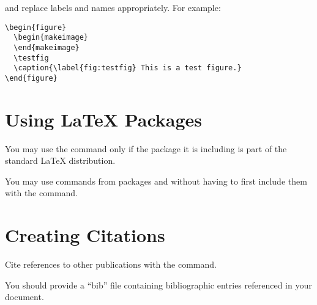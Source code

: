 \documentclass[11pt]{article}
\begin{document}
and replace labels and names appropriately.  For example:

\begin{verbatim}
\begin{figure}
  \begin{makeimage}
  \end{makeimage}
  \testfig
  \caption{\label{fig:testfig} This is a test figure.}
\end{figure}
\end{verbatim}


\section{Using \LaTeX{} Packages}

You may use the  command only if the package it is
including is part of the standard \LaTeX{} distribution.  

You may use commands from packages  and
 without having to first include them with the
 command.

\section{Creating Citations}

Cite references to other publications with the  command.

You should provide a ``bib'' file containing bibliographic entries
referenced in your document.


\begin{htmlonly}

\end{htmlonly}
\end{document}
